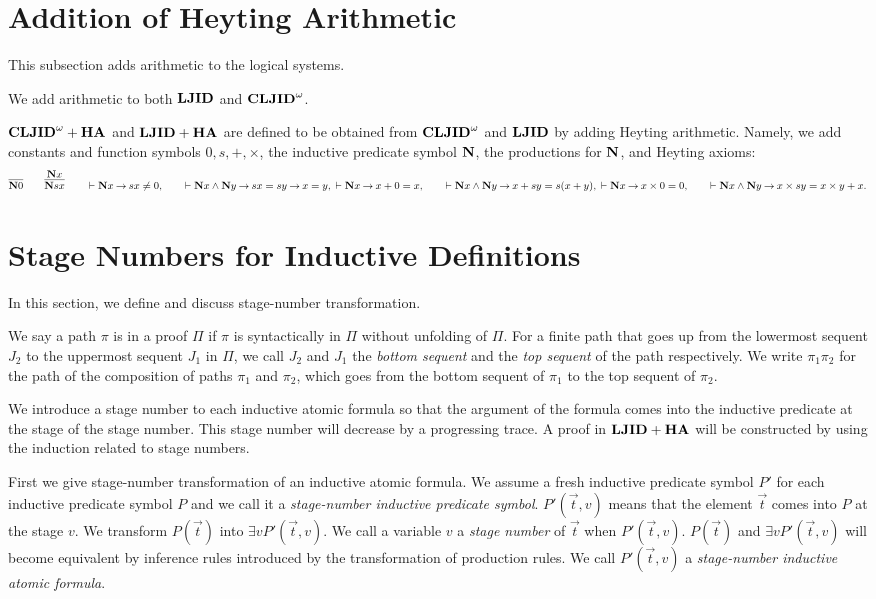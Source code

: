 \section{Addition of Heyting Arithmetic}

This subsection adds arithmetic to the logical systems.

We add arithmetic to both ${\bf LJID}$ and ${{\bf CLJID}^\omega}$.
\begin{Def}\rm
${{\bf CLJID}^\omega+{\bf HA}}$ and ${{\bf LJID}+{\bf HA}}$
are defined to be obtained from ${{\bf CLJID}^\omega}$ and ${\bf LJID}$
by adding Heyting arithmetic.
Namely, we add constants and function symbols $0, s, +, \times$,
the inductive predicate symbol ${\bf N}$, the productions for ${\bf N}$,
and Heyting axioms:
\[
\infer{\N0}{}
\qquad
\infer{\N s x}{\N x}
\qquad
\prove \N x \imp s x \ne 0, \qquad
\prove \N x \land \N y \imp s x=s y \imp x=y, \\
\prove \N x \imp x + 0 = x, \qquad
\prove \N x \land \N y \imp x + s y = s(x+y), \\
\prove \N x \imp x \times 0 = 0, \qquad
\prove \N x \land \N y \imp x \times s y = x \times y + x.
\]
\end{Def}

\section{Stage Numbers for Inductive Definitions}\label{sec:stagenumber}

In this section, we define and discuss stage-number transformation.

We say a path $\pi$ is in a proof $\Pi$ if $\pi$ is syntactically in $\Pi$
without unfolding of $\Pi$. 
For a finite path that goes up from the lowermost sequent $J_2$ to the uppermost sequent $J_1$ in $\Pi$,
we call $J_{2}$ and $J_{1}$ 
the {\em bottom sequent} and the {\em top sequent} of the path respectively.
We write $\pi_1\pi_2$ for the path of the composition of
paths $\pi_1$ and $\pi_2$,
which goes from the bottom sequent of $\pi_1$
to the top sequent of $\pi_2$.

We introduce a stage number to each inductive atomic formula 
so that
the argument of the formula comes into the inductive predicate at the stage 
of the stage number.
This stage number will decrease by a progressing trace.
A proof in ${{\bf LJID}+{\bf HA}}$ will be constructed by 
using the induction related to stage numbers.

First we give stage-number transformation of an inductive atomic formula.
We assume a fresh inductive predicate symbol $P'$ for
each inductive predicate symbol $P$
and we call it a {\em stage-number inductive predicate symbol}.
$P'(\Vec t,v)$ means that
the element $\Vec t$ comes into $P$ at the stage $v$.
We transform $P(\Vec t)$ into $\exists vP'(\Vec t,v)$.
We call a variable $v$ a {\em stage number}
of $\Vec t$ when $P'(\Vec t,v)$.
$P(\Vec t)$ and $\exists vP'(\Vec t,v)$ will become equivalent 
by inference rules introduced by the transformation of production rules.
We call $P'(\Vec t,v)$ a {\em stage-number inductive atomic formula}.

